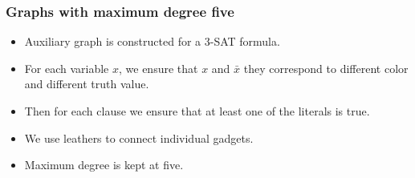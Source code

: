 \documentclass[aspectratio=\myaspectratio]{beamer}
\begin{document}
\begin{frame}
	\frametitle{Graphs with maximum degree five}

	\begin{itemize}
		\item
		      Auxiliary graph is constructed for a 3-SAT formula.
		\item
		      For each variable \( x \),
		      we ensure that \( x \) and \( \bar{x} \)
		      they correspond to different color and different truth value.
		\item
		      Then for each clause we ensure that at least one of the literals is true.
		\item
		      We use leathers to connect individual gadgets.
		\item
		      Maximum degree is kept at five.
	\end{itemize}
\end{frame}
\end{document}
